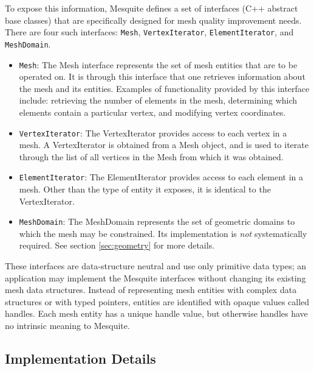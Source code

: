 To expose this information, Mesquite defines a set of interfaces 
(C++ abstract base classes) that are specifically designed for mesh
quality improvement needs.  There are four such interfaces: \texttt{Mesh},
\texttt{VertexIterator}, \texttt{ElementIterator}, and \texttt{MeshDomain}.
\begin{itemize}
\item \texttt{Mesh}: The Mesh interface represents the set of mesh
entities that are to be operated on.  It is through this interface
that one retrieves information about the mesh and its entities.
Examples of functionality provided by this interface include:
retrieving the number of elements in the mesh, determining which
elements contain a particular vertex, and modifying vertex
coordinates.
\item \texttt{VertexIterator}: The VertexIterator provides access to each
vertex in a mesh.  A VertexIterator is obtained from a Mesh object,
and is used to iterate through the list of all vertices in the Mesh
from which it was obtained.
\item \texttt{ElementIterator}: The ElementIterator provides access to
each element in a mesh.  Other than the type of entity it exposes, it
is identical to the VertexIterator.
\item \texttt{MeshDomain}: The MeshDomain represents the set of geometric
domains to which the mesh may be constrained. Its implementation is \emph{not} systematically 
required. See section \ref{sec:geometry} for more details. 
\end{itemize}
These interfaces are data-structure neutral and use only primitive
data types; an application may implement the Mesquite interfaces
without changing its existing mesh data structures.  Instead of
representing mesh entities with complex data structures or with typed
pointers, entities are identified with opaque values called handles.
Each mesh entity has a unique handle value, but otherwise handles have
no intrinsic meaning to Mesquite.  

\subsection{Implementation Details}

